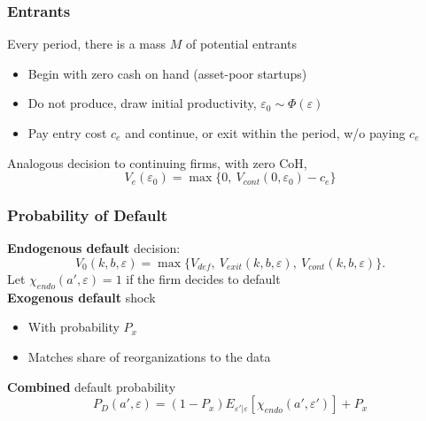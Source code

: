 \documentclass[aspectratio=169,xcolor=table]{beamer}
\begin{document}
\begin{frame}[label=Entrants] \frametitle{Entrants \hfill \hyperlink{Firmvalues}{} \hyperlink{distplot}{}}

Every period, there is a mass $M$ of potential entrants
\begin{itemize} \small
    \item Begin with zero cash on hand (asset-poor startups)  
    \item Do not produce, draw initial productivity, $\varepsilon_0 \sim \Phi(\varepsilon)$  
    \item Pay entry cost $c_e$ and continue, or exit within the period, w/o paying $c_e$
\end{itemize} \normalsize \vspace{5mm}

Analogous decision to continuing firms, with zero CoH,
\begin{equation*} \label{eq:entrant decision}
V_e(\varepsilon_0) = \max \{0, \ V_{cont}(0,\varepsilon_0) - c_e \}
\end{equation*}


\end{frame}

\begin{frame}[label=Default] \frametitle{Probability of Default \hfill \hyperlink{LiqReorg}{}}
\textbf{Endogenous default} decision:
\begin{equation*} \label{eq:default decision}
    V_0(k,b,\varepsilon) = \max \{V_{def}, \  V_{exit}(k,b,\varepsilon),  \ V_{cont}(k,b,\varepsilon) \}.
\end{equation*}
Let $\chi_{endo}(a', \varepsilon) = 1$ if the firm decides to default \vspace{3mm} \\

\textbf{Exogenous default} shock 
\begin{itemize} \small
    \item With probability $P_{x}$
    \item Matches share of reorganizations to the data
\end{itemize} \normalsize

\textbf{Combined} default probability 
$$  P_D(a', \varepsilon) = (1-P_x)E_{\varepsilon'|\varepsilon}[\chi_{endo}(a',\varepsilon')] + P_{x}  $$


\end{frame}
\end{document}
